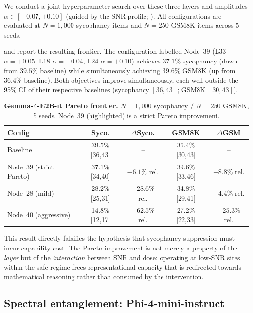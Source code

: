 \documentclass{article}
\begin{document}
We conduct a joint hyperparameter search over these three layers and
amplitudes $\alpha \in [-0.07, +0.10]$ (guided by the SNR profile;
). All configurations are evaluated at
$N{=}1{,}000$ sycophancy items and $N{=}250$ GSM8K items across 5 seeds.

 and  report the resulting
frontier. The configuration labelled Node~39
(L33 $\alpha{=}{+}0.05$, L18 $\alpha{=}{-}0.04$, L24 $\alpha{=}{+}0.10$)
achieves $37.1\%$ sycophancy (down from $39.5\%$ baseline) while
simultaneously achieving $39.6\%$ GSM8K (up from $36.4\%$ baseline).
Both objectives improve simultaneously, each well outside the 95\% CI
of their respective baselines (sycophancy $[36,43]$; GSM8K $[30,43]$).

\begin{table}[h]
\centering
\small
\setlength{\tabcolsep}{6pt}
\caption{\textbf{Gemma-4-E2B-it Pareto frontier.}
$N{=}1{,}000$ sycophancy / $N{=}250$ GSM8K, 5 seeds. Node~39
(highlighted) is a strict Pareto improvement.}
\label{tab:gemma_pareto}
\begin{tabular}{lcccc}
\toprule
\textbf{Config} & \textbf{Syco.} & $\Delta$\textbf{Syco.}
 & \textbf{GSM8K} & $\Delta$\textbf{GSM} \\
\midrule
Baseline & 39.5\% [36,43] & -- & 36.4\% [30,43] & -- \\
\rowcolor{pcgreenlt!40}
Node~39 (strict Pareto) & 37.1\% [34,40] & $-6.1\%$ rel. & 39.6\% [33,46] & $+8.8\%$ rel. \\
Node~28 (mild) & 28.2\% [25,31] & $-28.6\%$ rel. & 34.8\% [29,41] & $-4.4\%$ rel. \\
Node~40 (aggressive) & 14.8\% [12,17] & $-62.5\%$ rel. & 27.2\% [22,33] & $-25.3\%$ rel. \\
\bottomrule
\end{tabular}
\end{table}

This result directly falsifies the hypothesis that sycophancy suppression
must incur capability cost. The Pareto improvement is not merely a property
of the \emph{layer} but of the \emph{interaction} between SNR and dose:
operating at low-SNR sites within the safe regime frees representational
capacity that is redirected towards mathematical reasoning rather than
consumed by the intervention.

\subsection{Spectral entanglement: Phi-4-mini-instruct}
\label{sec:phi4_entanglement}
\end{document}
